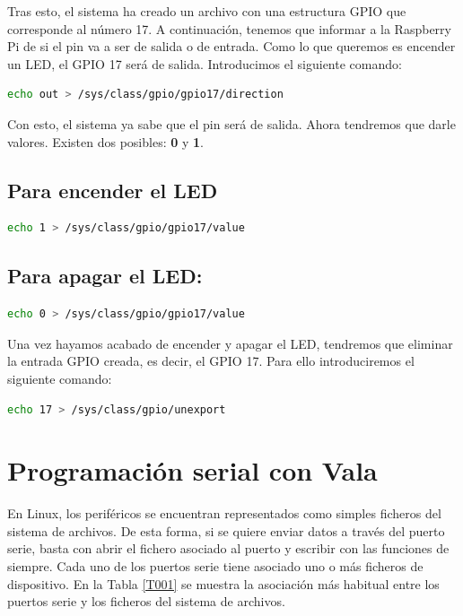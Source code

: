 \documentclass[12pt,twoside]{book}
\begin{document}
Tras esto, el sistema ha creado un archivo con una estructura GPIO que corresponde al número 17. A continuación, tenemos que informar a la Raspberry Pi de si el pin va a ser de salida o de entrada. Como lo que queremos es encender un LED, el GPIO 17 será de salida. Introducimos el siguiente comando: 

\begin{lstlisting}[language=bash]
echo out > /sys/class/gpio/gpio17/direction
\end{lstlisting}


Con esto, el sistema ya sabe que el pin será de salida. Ahora tendremos que darle valores. Existen dos posibles: \textbf{0} y \textbf{1}. 

\subsection{Para encender el LED}

\begin{lstlisting}[language=bash]
echo 1 > /sys/class/gpio/gpio17/value
\end{lstlisting}


 \subsection{ Para apagar el LED:}
 
 \begin{lstlisting}[language=bash]
echo 0 > /sys/class/gpio/gpio17/value
\end{lstlisting}

Una vez hayamos acabado de encender y apagar el LED, tendremos que eliminar la entrada GPIO creada, es decir, el GPIO 17. Para ello introduciremos el siguiente comando: 

\begin{lstlisting}[language=bash]	
echo 17 > /sys/class/gpio/unexport
\end{lstlisting}


\section{Programación serial con Vala}

En Linux, los periféricos se encuentran representados como simples ficheros del
sistema de archivos. De esta forma, si se quiere enviar datos a través del puerto
serie, basta con abrir el fichero asociado al puerto y escribir con las funciones de
siempre. Cada uno de los puertos serie tiene asociado uno o más ficheros de
dispositivo. En la Tabla \ref{T001} se muestra la asociación más habitual entre los
puertos serie y los ficheros del sistema de archivos.
\end{document}
